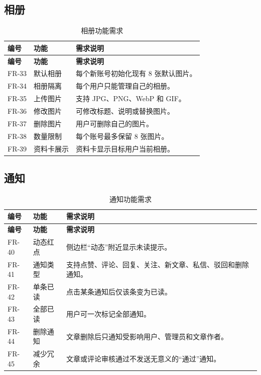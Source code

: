 \documentclass[UTF8,a4paper,12pt]{ctexart}
\begin{document}
\subsection{相册}

\begin{longtable}{>{\centering\arraybackslash}p{2.1cm}p{3.3cm}p{8.6cm}}
\caption{相册功能需求}\\
\toprule
\rowcolor{tablehead}\textbf{编号} & \textbf{功能} & \textbf{需求说明}\\
\midrule
\endfirsthead
\toprule
\rowcolor{tablehead}\textbf{编号} & \textbf{功能} & \textbf{需求说明}\\
\midrule
\endhead
FR-33 & 默认相册 & 每个新账号初始化现有 8 张默认图片。\\
FR-34 & 相册隔离 & 每个用户只能管理自己的相册。\\
FR-35 & 上传图片 & 支持 JPG、PNG、WebP 和 GIF。\\
FR-36 & 修改图片 & 可修改标题、说明或替换图片。\\
FR-37 & 删除图片 & 用户可删除自己的图片。\\
FR-38 & 数量限制 & 每个账号最多保留 8 张图片。\\
FR-39 & 资料卡展示 & 资料卡显示目标用户当前相册。\\
\bottomrule
\end{longtable}

\subsection{通知}

\begin{longtable}{>{\centering\arraybackslash}p{2.1cm}p{3.3cm}p{8.6cm}}
\caption{通知功能需求}\\
\toprule
\rowcolor{tablehead}\textbf{编号} & \textbf{功能} & \textbf{需求说明}\\
\midrule
\endfirsthead
\toprule
\rowcolor{tablehead}\textbf{编号} & \textbf{功能} & \textbf{需求说明}\\
\midrule
\endhead
FR-40 & 动态红点 & 侧边栏“动态”附近显示未读提示。\\
FR-41 & 通知类型 & 支持点赞、评论、回复、关注、新文章、私信、驳回和删除通知。\\
FR-42 & 单条已读 & 点击某条通知后仅该条变为已读。\\
FR-43 & 全部已读 & 用户可一次标记全部通知。\\
FR-44 & 删除通知 & 文章删除后只通知受影响用户、管理员和文章作者。\\
FR-45 & 减少冗余 & 文章或评论审核通过不发送无意义的“通过”通知。\\
\bottomrule
\end{longtable}
\end{document}
